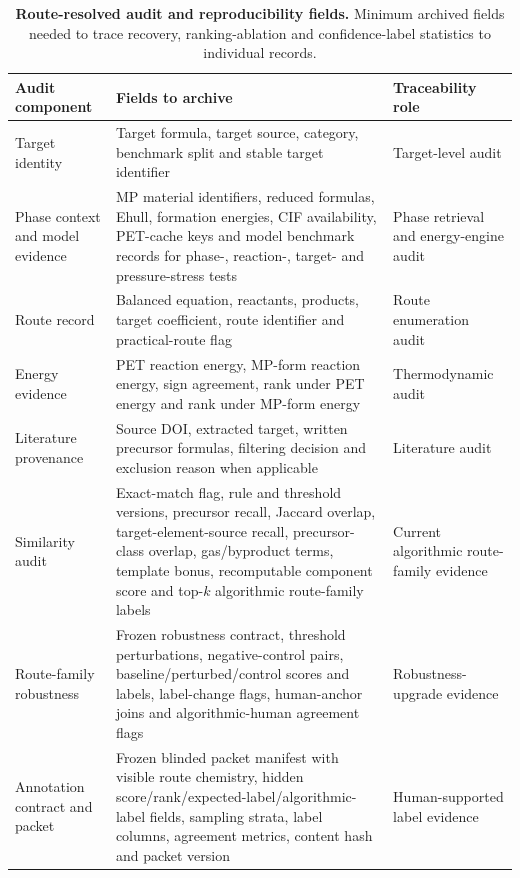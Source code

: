 \documentclass[11pt, letterpaper]{article}
\renewcommand{\arraystretch}{1.08}
\begin{document}
\begin{table}[p]
\centering
\tiny
\caption{\textbf{Route-resolved audit and reproducibility fields.} Minimum archived fields needed to trace recovery, ranking-ablation and confidence-label statistics to individual records.}
\begingroup
\setlength{\tabcolsep}{1.5pt}
\renewcommand{\arraystretch}{0.78}
\begin{tabular}{L{0.24\textwidth}L{0.515\textwidth}L{0.145\textwidth}}
\toprule
\textbf{Audit component} & \textbf{Fields to archive} & \textbf{Traceability role} \\
\midrule
Target identity & Target formula, target source, category, benchmark split and stable target identifier & Target-level audit \\
Phase context and model evidence & MP material identifiers, reduced formulas, Ehull, formation energies, CIF availability, PET-cache keys and model benchmark records for phase-, reaction-, target- and pressure-stress tests & Phase retrieval and energy-engine audit \\
Route record & Balanced equation, reactants, products, target coefficient, route identifier and practical-route flag & Route enumeration audit \\
Energy evidence & PET reaction energy, MP-form reaction energy, sign agreement, rank under PET energy and rank under MP-form energy & Thermodynamic audit \\
Literature provenance & Source DOI, extracted target, written precursor formulas, filtering decision and exclusion reason when applicable & Literature audit \\
Similarity audit & Exact-match flag, rule and threshold versions, precursor recall, Jaccard overlap, target-element-source recall, precursor-class overlap, gas/byproduct terms, template bonus, recomputable component score and top-$k$ algorithmic route-family labels & Current algorithmic route-family evidence \\
Route-family robustness & Frozen robustness contract, threshold perturbations, negative-control pairs, baseline/perturbed/control scores and labels, label-change flags, human-anchor joins and algorithmic-human agreement flags & Robustness-upgrade evidence \\
Annotation contract and packet & Frozen blinded packet manifest with visible route chemistry, hidden score/rank/expected-label/algorithmic-label fields, sampling strata, label columns, agreement metrics, content hash and packet version & Human-supported label evidence \\

\end{tabular}
\end{table}
\end{document}

